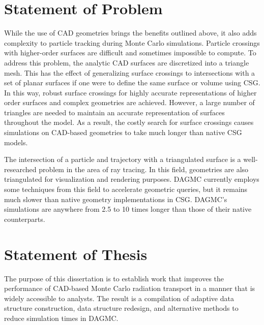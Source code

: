 \section{Statement of Problem}

While the use of CAD geometries brings the benefits outlined above, it also adds
complexity to particle tracking during Monte Carlo simulations. Particle
crossings with higher-order surfaces are difficult and sometimes impossible to
compute. To address this problem, the analytic CAD surfaces are
discretized into a triangle mesh. This has the effect of generalizing surface crossings to
intersections with a set of planar surfaces if one were to define the same
surface or volume using CSG. In this way, robust surface crossings for highly
accurate representations of higher order surfaces and complex geometries are
achieved. However, a large number of triangles are needed to maintain an
accurate representation of surfaces throughout the model. As a result, the
costly search for surface crossings causes simulations on CAD-based geometries
to take much longer than native CSG models.

The intersection of a particle and trajectory with a triangulated surface is a
well-researched problem in the area of ray tracing. In this field, geometries
are also triangulated for visualization and rendering purposes. DAGMC currently
employs some techniques from this field to accelerate geometric queries, but it
remains much slower than native geometry implementations in CSG. DAGMC's
simulations are anywhere from 2.5 to 10 times longer than those of their native
counterparts.

\newpage
\section{Statement of Thesis}

The purpose of this dissertation is to establish work that improves the
performance of CAD-based Monte Carlo radiation transport in a manner that is
widely accessible to analysts. The result is a compilation of adaptive data
structure construction, data structure redesign, and alternative methods to
reduce simulation times in DAGMC.



